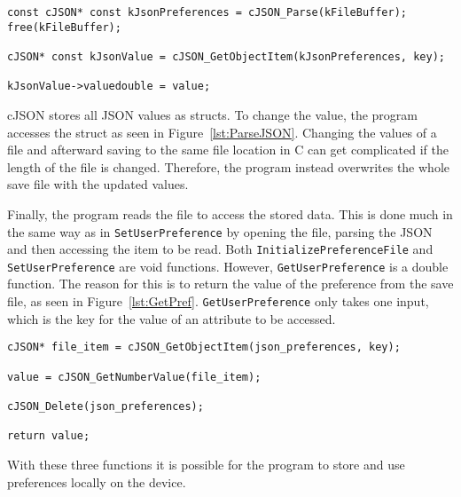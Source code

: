 \begin{lstlisting}[label={lst:ParseJSON}, caption={Parsing JSON.}]
const cJSON* const kJsonPreferences = cJSON_Parse(kFileBuffer);
free(kFileBuffer);

cJSON* const kJsonValue = cJSON_GetObjectItem(kJsonPreferences, key);

kJsonValue->valuedouble = value;
\end{lstlisting}

cJSON stores all JSON values as structs.
To change the value, the program accesses the struct as seen in Figure~\ref{lst:ParseJSON}.
Changing the values of a file and afterward saving to the same file location in C can get complicated if the length of
the file is changed.
Therefore, the program instead overwrites the whole save file with the updated values.

Finally, the program reads the file to access the stored data.
This is done much in the same way as in \texttt{SetUserPreference} by opening the file, parsing the JSON and then
accessing the item to be read.
Both \texttt{InitializePreferenceFile} and \texttt{SetUserPreference} are void functions.
However, \texttt{GetUserPreference} is a double function.
The reason for this is to return the value of the preference from the save file, as seen in Figure~\ref{lst:GetPref}.
\texttt{GetUserPreference} only takes one input, which is the key for the value of an attribute to be accessed.

\begin{lstlisting}[label={lst:GetPref}, caption={Reading attribute value from preference file.}]
cJSON* file_item = cJSON_GetObjectItem(json_preferences, key);

value = cJSON_GetNumberValue(file_item);

cJSON_Delete(json_preferences);

return value;
\end{lstlisting}

With these three functions it is possible for the program to store and use preferences locally on the device.
